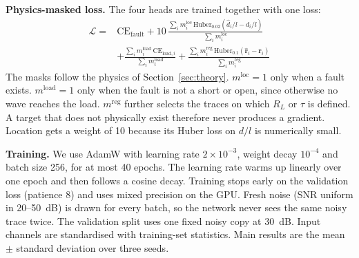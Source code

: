 \textbf{Physics-masked loss.} The four heads are trained together with one loss:
\begin{equation}
\begin{aligned}
\mathcal{L} = {} & \mathrm{CE}_{\mathrm{fault}} + 10\, \frac{\sum_i m^{\mathrm{loc}}_i\, \mathrm{Huber}_{0.02}\!\left(\hat d_i/l - d_i/l\right)}{\sum_i m^{\mathrm{loc}}_i} \\
& + \frac{\sum_i m^{\mathrm{load}}_i\, \mathrm{CE}_{\mathrm{load},i}}{\sum_i m^{\mathrm{load}}_i} + \frac{\sum_i m^{\mathrm{reg}}_i\, \mathrm{Huber}_{0.1}\!\left(\hat{\mathbf r}_i - \mathbf r_i\right)}{\sum_i m^{\mathrm{reg}}_i}
\end{aligned}
\label{eq:total_loss}
\end{equation}
The masks follow the physics of Section~\ref{sec:theory}. $m^{\mathrm{loc}} = 1$ only when a fault exists. $m^{\mathrm{load}} = 1$ only when the fault is not a short or open, since otherwise no wave reaches the load. $m^{\mathrm{reg}}$ further selects the traces on which $R_L$ or $\tau$ is defined. A target that does not physically exist therefore never produces a gradient. Location gets a weight of 10 because its Huber loss on $d/l$ is numerically small.

\textbf{Training.} We use AdamW with learning rate $2\times10^{-3}$, weight decay $10^{-4}$ and batch size 256, for at most 40 epochs. The learning rate warms up linearly over one epoch and then follows a cosine decay. Training stops early on the validation loss (patience 8) and uses mixed precision on the GPU. Fresh noise (SNR uniform in 20--50~dB) is drawn for every batch, so the network never sees the same noisy trace twice. The validation split uses one fixed noisy copy at 30~dB. Input channels are standardised with training-set statistics. Main results are the mean $\pm$ standard deviation over three seeds.
